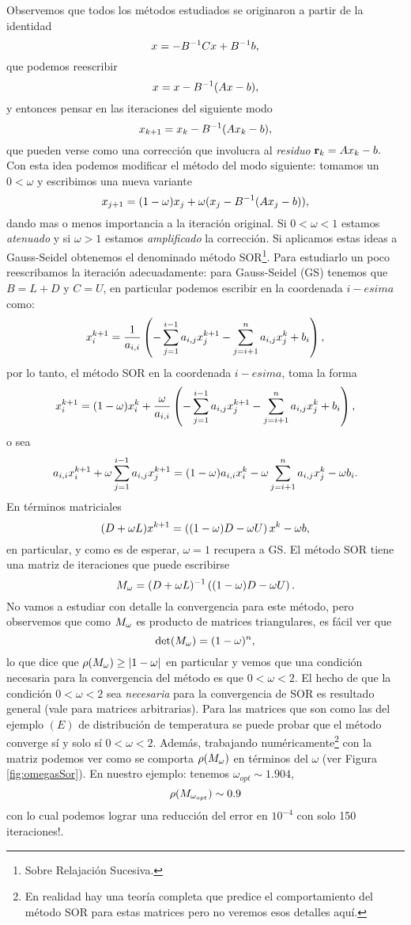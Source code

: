 Observemos que todos los métodos estudiados se originaron a partir de la identidad
$$
\xb=-\Bb^{-1}\Cb\xb+\Bb^{-1}\bb,
$$
que podemos reescribir
$$
\xb=\xb-\Bb^{-1}(\Ab\xb-\bb),
$$
y entonces pensar en las iteraciones del siguiente modo
$$
\xb_{k+1}=\xb_k-\Bb^{-1}(\Ab\xb_k-\bb),
$$
que pueden verse como una corrección que involucra al \emph{residuo} $\rb_k=\Ab\xb_k-\bb.$ Con esta idea podemos modificar el método del modo siguiente: tomamos un  $0<\omega$ y escribimos una nueva variante
$$
\xb_{j+1}=(1-\omega)\xb_j+
\omega(\xb_j-\Bb^{-1}(\Ab\xb_j-\bb)),
$$
dando mas o menos importancia a la iteración original. Si $0<\omega<1$ estamos \emph{atenuado} y si $\omega>1$ estamos  \emph{amplificado} la corrección. Si aplicamos estas ideas a Gauss-Seidel obtenemos el denominado método SOR\footnote{Sobre Relajación Sucesiva.}. Para estudiarlo un poco reescribamos la iteración adecuadamente:
para Gauss-Seidel (GS) tenemos que $B=L+D$ y $C=U$, en particular podemos escribir en la coordenada $i-esima$ como:
$$
\xb^{k+1}_i=\frac{1}{a_{i,i}}\left(-\sum_{j=1}^{i-1}a_{i,j}\xb_j^{k+1}-\sum_{j=i+1}^{n}a_{i,j}\xb_j^k+\bb_i\right),
$$
por lo tanto, el método SOR
 en la coordenada $i-esima$, toma la forma
$$
\xb^{k+1}_i=(1-\omega)\xb^k_i+
\frac{\omega}{a_{i,i}}\left(-\sum_{j=1}^{i-1}a_{i,j}\xb_j^{k+1}-\sum_{j=i+1}^{n}a_{i,j}\xb_j^k+\bb_i\right),
$$
o sea
$$
a_{i,i}\xb^{k+1}_i+\omega\sum_{j=1}^{i-1}a_{i,j}\xb_j^{k+1}=(1-\omega)a_{i,i}\xb^k_i-
\omega\sum_{j=i+1}^{n}a_{i,j}\xb_j^k -\omega\bb_i.
$$
En términos matriciales
$$
(\Db+\omega \Lb)\xb^{k+1}=\left((1-\omega)\Db-\omega\Ub\right)\xb^{k}-\omega \bb,
$$
en particular, y como es de esperar, $\omega=1$ recupera a GS. El método SOR tiene una matriz de iteraciones que puede escribirse
$$
\Mb_\omega=(\Db+\omega \Lb)^{-1}\left((1-\omega)\Db-\omega\Ub\right).
$$
No vamos a estudiar con detalle la convergencia para este método, pero observemos que como $\Mb_\omega$ es producto de matrices triangulares, es fácil ver que
$$
\det (\Mb_\omega)=(1-\omega)^n,
$$
lo que dice que
$\rho(\Mb_\omega)\ge |1-\omega|$
en particular y vemos que una condición necesaria para la convergencia del  m\'etodo  es que $0<\omega<2$.
\tcc
El hecho de que la condición $0<\omega<2$ sea \emph{necesaria} para la convergencia de SOR es resultado general (vale para matrices arbitrarias). Para las matrices que son como las del ejemplo $(E)$ de distribución de temperatura se puede probar que el método converge sí y solo sí $0<\omega<2$. Además, trabajando numéricamente\footnote{En realidad hay una teoría completa que predice el comportamiento del método SOR para estas matrices pero no veremos esos detalles aquí.} con la matriz podemos ver como se comporta $\rho(\Mb_\omega)$ en términos del $\omega$ (ver Figura \ref{fig:omegasSor}). En nuestro ejemplo:
tenemos $\omega_{opt}\sim 1.904$,
$$
\rho(\Mb_{\omega_{opt}})\sim 0.9
$$
con lo cual podemos lograr una reducción del error en $10^{-4}$ con solo 150 iteraciones!.
\etcc

